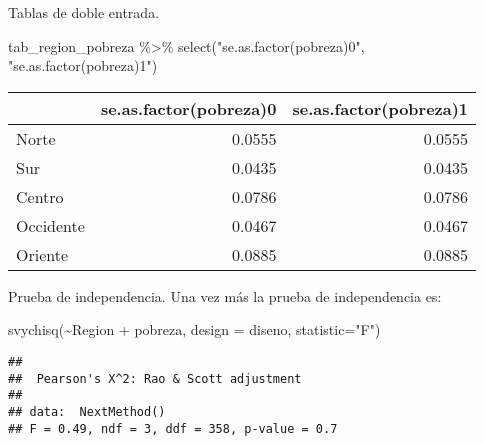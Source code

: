 \documentclass[
  ignorenonframetext,
]{beamer}
\newenvironment{Shaded}{\begin{snugshade}}{\end{snugshade}}
\newcommand{\AttributeTok}[1]{\textcolor[rgb]{0.77,0.63,0.00}{#1}}
\newcommand{\FunctionTok}[1]{\textcolor[rgb]{0.00,0.00,0.00}{#1}}
\newcommand{\NormalTok}[1]{#1}
\newcommand{\SpecialCharTok}[1]{\textcolor[rgb]{0.00,0.00,0.00}{#1}}
\newcommand{\StringTok}[1]{\textcolor[rgb]{0.31,0.60,0.02}{#1}}
\begin{document}
\begin{frame}[fragile]{Tablas de doble entrada.}
\protect\hypertarget{tablas-de-doble-entrada.-4}{}
\begin{Shaded}
\begin{Highlighting}[]
\NormalTok{tab\_region\_pobreza }\SpecialCharTok{\%\textgreater{}\%} 
 \FunctionTok{select}\NormalTok{(}\StringTok{"se.as.factor(pobreza)0"}\NormalTok{,}
        \StringTok{"se.as.factor(pobreza)1"}\NormalTok{)}
\end{Highlighting}
\end{Shaded}

\begin{longtable}[]{@{}lrr@{}}
\toprule
& se.as.factor(pobreza)0 & se.as.factor(pobreza)1 \\
\midrule
\endhead
Norte & 0.0555 & 0.0555 \\
Sur & 0.0435 & 0.0435 \\
Centro & 0.0786 & 0.0786 \\
Occidente & 0.0467 & 0.0467 \\
Oriente & 0.0885 & 0.0885 \\
\bottomrule
\end{longtable}
\end{frame}

\begin{frame}[fragile]{Prueba de independencia.}
\protect\hypertarget{prueba-de-independencia.-2}{}
Una vez más la prueba de independencia es:

\begin{Shaded}
\begin{Highlighting}[]
\FunctionTok{svychisq}\NormalTok{(}\SpecialCharTok{\textasciitilde{}}\NormalTok{Region }\SpecialCharTok{+}\NormalTok{ pobreza, }
         \AttributeTok{design =}\NormalTok{ diseno,  }\AttributeTok{statistic=}\StringTok{"F"}\NormalTok{)}
\end{Highlighting}
\end{Shaded}

\begin{verbatim}
## 
##  Pearson's X^2: Rao & Scott adjustment
## 
## data:  NextMethod()
## F = 0.49, ndf = 3, ddf = 358, p-value = 0.7
\end{verbatim}
\end{frame}
\end{document}
